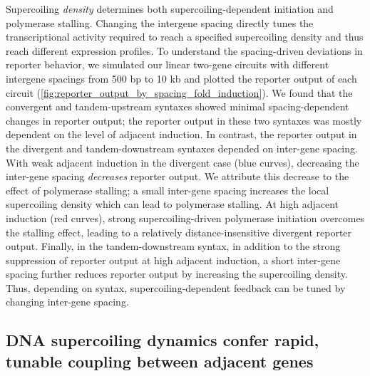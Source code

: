 \documentclass[11pt]{article}
\begin{document}
Supercoiling \emph{density} determines both supercoiling-dependent initiation and polymerase stalling. Changing the intergene spacing directly tunes the transcriptional activity required to reach a specified supercoiling density and thus reach different expression profiles. To understand the spacing-driven deviations in reporter behavior, we simulated our linear two-gene circuits with different intergene spacings from 500 bp to 10 kb and plotted the reporter output of each circuit (\cref{fig:reporter_output_by_spacing_fold_induction}). We found that the convergent and tandem-upstream syntaxes showed minimal spacing-dependent changes in reporter output; the reporter output in these two syntaxes was mostly dependent on the level of adjacent induction. In contrast, the reporter output in the divergent and tandem-downstream syntaxes depended on inter-gene spacing. With weak adjacent induction in the divergent case (blue curves), decreasing the inter-gene spacing \emph{decreases} reporter output. We attribute this decrease to the effect of polymerase stalling; a small inter-gene spacing increases the local supercoiling density which can lead to polymerase stalling. At high adjacent induction (red curves), strong supercoiling-driven polymerase initiation overcomes the stalling effect, leading to a relatively distance-insensitive divergent reporter output. Finally, in the tandem-downstream syntax, in addition to the strong suppression of reporter output at high adjacent induction, a short inter-gene spacing further reduces reporter output by increasing the supercoiling density. Thus, depending on syntax, supercoiling-dependent feedback can be tuned by changing inter-gene spacing.


\subsection{DNA supercoiling dynamics confer rapid, tunable coupling between adjacent genes}
\end{document}
